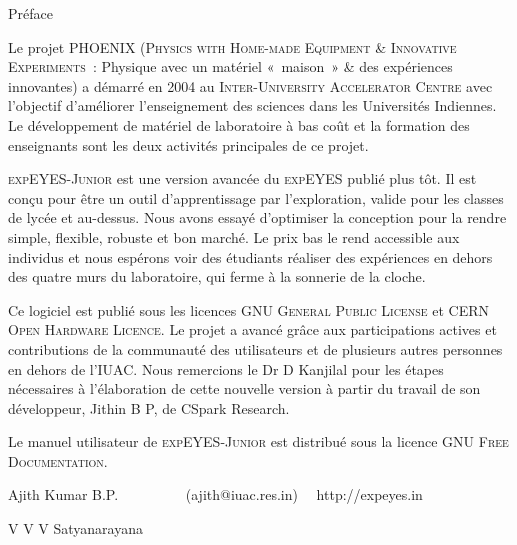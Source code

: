 \documentclass[12pt,a4paper]{report}
\begin{document}
\thispagestyle{empty}

Préface

Le projet PHOENIX (\textsc{Physics with Home-made Equipment \& Innovative
Experiments}~: Physique avec un matériel «~maison~» \& des expériences
innovantes) a démarré en 2004 au \textsc{Inter-University Accelerator
Centre} avec l'objectif d'améliorer l'enseignement des sciences dans
les Universités Indiennes. Le développement de matériel de laboratoire
à bas coût et la formation des enseignants sont les deux activités
principales de ce projet.

\textsc{expEYES-Junior} est une version avancée du \textsc{expEYES} publié
plus tôt. Il est conçu pour être un outil d'apprentissage par l'exploration,
valide pour les classes de lycée et au-dessus. Nous avons essayé d'optimiser
la conception pour la rendre simple, flexible, robuste et bon marché.
Le prix bas le rend accessible aux individus et nous espérons voir
des étudiants réaliser des expériences en dehors des quatre murs du
laboratoire, qui ferme à la sonnerie de la cloche.

Ce logiciel est publié sous les licences \textsc{GNU General Public
License} et \textsc{CERN Open Hardware Licence}. Le projet a avancé
grâce aux participations actives et contributions de la communauté
des utilisateurs et de plusieurs autres personnes en dehors de l'\textsc{IUAC}.
Nous remercions le Dr D Kanjilal pour les étapes nécessaires à l'élaboration
de cette nouvelle version à partir du travail de son développeur,
Jithin B P, de CSpark Research.

Le manuel utilisateur de \textsc{expEYES-Junior} est distribué sous la
licence \textsc{GNU Free Documentation}.

Ajith Kumar B.P. ~~~~~~~~~(ajith@iuac.res.in) ~~http://expeyes.in

V V V Satyanarayana
\end{document}
